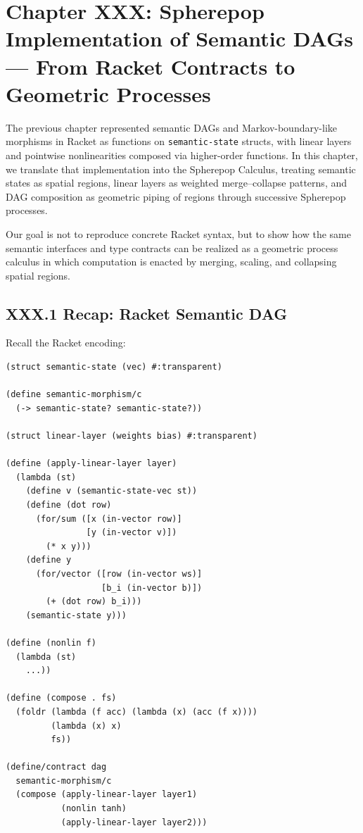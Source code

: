 \documentclass[12pt,letterpaper]{article}
\begin{document}
\newpage

\section{Chapter XXX: Spherepop Implementation of Semantic DAGs —  
From Racket Contracts to Geometric Processes}

The previous chapter represented semantic DAGs and Markov-boundary-like morphisms in Racket as functions on \texttt{semantic-state} structs, with linear layers and pointwise nonlinearities composed via higher-order functions. In this chapter, we translate that implementation into the Spherepop Calculus, treating semantic states as spatial regions, linear layers as weighted merge--collapse patterns, and DAG composition as geometric piping of regions through successive Spherepop processes.

Our goal is not to reproduce concrete Racket syntax, but to show how the same semantic interfaces and type contracts can be realized as a geometric process calculus in which computation is enacted by merging, scaling, and collapsing spatial regions.

\subsection{XXX.1 Recap: Racket Semantic DAG}

Recall the Racket encoding:

\begin{verbatim}
(struct semantic-state (vec) #:transparent)

(define semantic-morphism/c
  (-> semantic-state? semantic-state?))

(struct linear-layer (weights bias) #:transparent)

(define (apply-linear-layer layer)
  (lambda (st)
    (define v (semantic-state-vec st))
    (define (dot row)
      (for/sum ([x (in-vector row)]
                [y (in-vector v)])
        (* x y)))
    (define y
      (for/vector ([row (in-vector ws)]
                   [b_i (in-vector b)])
        (+ (dot row) b_i)))
    (semantic-state y)))

(define (nonlin f)
  (lambda (st)
    ...))

(define (compose . fs)
  (foldr (lambda (f acc) (lambda (x) (acc (f x))))
         (lambda (x) x)
         fs))

(define/contract dag
  semantic-morphism/c
  (compose (apply-linear-layer layer1)
           (nonlin tanh)
           (apply-linear-layer layer2)))
\end{verbatim}
\end{document}
